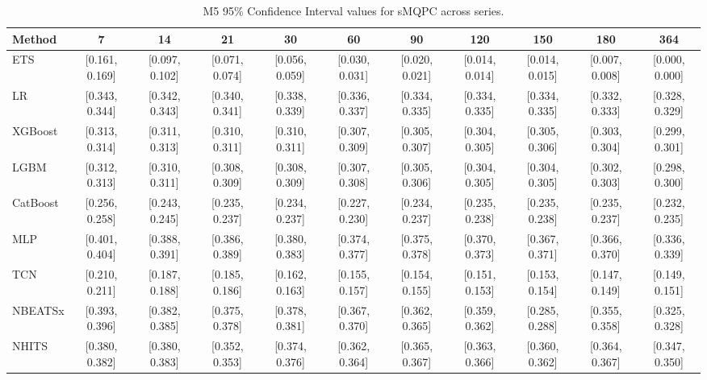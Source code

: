 \begin{table}[!ht]
\centering
\begin{adjustbox}{max width=\textwidth}
\begin{tabular}{lcccccccccc}
\toprule
Method & 7 & 14 & 21 & 30 & 60 & 90 & 120 & 150 & 180 & 364 \\
\midrule
ETS & [0.161, 0.169] & [0.097, 0.102] & [0.071, 0.074] & [0.056, 0.059] & [0.030, 0.031] & [0.020, 0.021] & [0.014, 0.014] & [0.014, 0.015] & [0.007, 0.008] & [0.000, 0.000] \\
LR & [0.343, 0.344] & [0.342, 0.343] & [0.340, 0.341] & [0.338, 0.339] & [0.336, 0.337] & [0.334, 0.335] & [0.334, 0.335] & [0.334, 0.335] & [0.332, 0.333] & [0.328, 0.329] \\
XGBoost & [0.313, 0.314] & [0.311, 0.313] & [0.310, 0.311] & [0.310, 0.311] & [0.307, 0.309] & [0.305, 0.307] & [0.304, 0.305] & [0.305, 0.306] & [0.303, 0.304] & [0.299, 0.301] \\
LGBM & [0.312, 0.313] & [0.310, 0.311] & [0.308, 0.309] & [0.308, 0.309] & [0.307, 0.308] & [0.305, 0.306] & [0.304, 0.305] & [0.304, 0.305] & [0.302, 0.303] & [0.298, 0.300] \\
CatBoost & [0.256, 0.258] & [0.243, 0.245] & [0.235, 0.237] & [0.234, 0.237] & [0.227, 0.230] & [0.234, 0.237] & [0.235, 0.238] & [0.235, 0.238] & [0.235, 0.237] & [0.232, 0.235] \\
MLP & [0.401, 0.404] & [0.388, 0.391] & [0.386, 0.389] & [0.380, 0.383] & [0.374, 0.377] & [0.375, 0.378] & [0.370, 0.373] & [0.367, 0.371] & [0.366, 0.370] & [0.336, 0.339] \\
TCN & [0.210, 0.211] & [0.187, 0.188] & [0.185, 0.186] & [0.162, 0.163] & [0.155, 0.157] & [0.154, 0.155] & [0.151, 0.153] & [0.153, 0.154] & [0.147, 0.149] & [0.149, 0.151] \\
NBEATSx & [0.393, 0.396] & [0.382, 0.385] & [0.375, 0.378] & [0.378, 0.381] & [0.367, 0.370] & [0.362, 0.365] & [0.359, 0.362] & [0.285, 0.288] & [0.355, 0.358] & [0.325, 0.328] \\
NHITS & [0.380, 0.382] & [0.380, 0.383] & [0.352, 0.353] & [0.374, 0.376] & [0.362, 0.364] & [0.365, 0.367] & [0.363, 0.366] & [0.360, 0.362] & [0.364, 0.367] & [0.347, 0.350] \\
\bottomrule
\end{tabular}
\end{adjustbox}
\caption{M5 95\% Confidence Interval values for sMQPC across series.}
\label{tab:ci_m5_smqpc}
\end{table}

